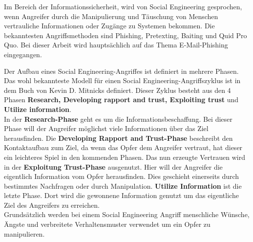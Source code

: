 	Im Bereich der Informationssicherheit, wird von Social Engineering gesprochen, wenn Angreifer durch die Manipulierung und Täuschung von Menschen vertrauliche Informationen oder Zugänge zu Systemen bekommen. Die bekanntesten Angriffsmethoden sind Phishing, Pretexting, Baiting und Quid Pro Quo. Bei dieser Arbeit wird hauptsächlich auf das Thema E-Mail-Phishing eingegangen.

	Der Aufbau eines Social Engineering-Angriffes ist definiert in mehrere Phasen. Das wohl bekannteste Modell für einen Social Engineering-Angriffszyklus ist in dem Buch von Kevin D. Mitnicks \cite{ArtOfDeception} definiert. Dieser Zyklus besteht aus den 4 Phasen \textbf{Research, Developing rapport and trust, Exploiting trust} und \textbf{Utilize information}.\\
	In der \textbf{Research-Phase} geht es um die Informationsbeschaffung. Bei dieser Phase will der Angreifer möglichst viele Informationen über das Ziel herausfinden. Die \textbf{Developing Rapport and Trust-Phase} beschreibt den Kontaktaufbau zum Ziel, da wenn das Opfer dem Angreifer vertraut, hat dieser ein leichteres Spiel in den kommenden Phasen. Das nun erzeugte Vertrauen wird in der \textbf{Exploitung Trust-Phase} ausgenutzt. Hier will der Angreifer die eigentlich Information vom Opfer herausfinden. Dies geschieht einerseits durch bestimmtes Nachfragen oder durch Manipulation.
	\textbf{Utilize Information} ist die letzte Phase. Dort wird die gewonnene Information genutzt um das eigentliche Ziel des Angreifers zu erreichen.\\
	Grundsätzlich werden bei einem Social Engineering Angriff menschliche Wünsche, Ängste und verbreitete Verhaltensmuster verwendet um ein Opfer zu manipulieren.\cite{LeitfadenSE}\\

